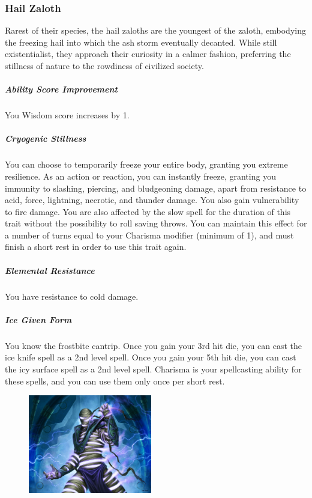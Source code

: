 \subsubsection{Hail Zaloth}
    Rarest of their species, the hail zaloths are the youngest of the zaloth, embodying the freezing hail into which the ash storm eventually decanted.
    While still existentialist, they approach their curiosity in a calmer fashion, preferring the stillness of nature to the rowdiness of civilized society.

    \subparagraph{Ability Score Improvement} You Wisdom score increases by 1.

    \subparagraph{Cryogenic Stillness} You can choose to temporarily freeze your entire body, granting you extreme resilience.
    As an action or reaction, you can instantly freeze, granting you immunity to slashing, piercing, and bludgeoning damage, apart from resistance to acid, force, lightning, necrotic, and thunder damage.
    You also gain vulnerability to fire damage.
    You are also affected by the slow spell for the duration of this trait without the possibility to roll saving throws.
    You can maintain this effect for a number of turns equal to your Charisma modifier (minimum of 1), and must finish a short rest in order to use this trait again.

    \subparagraph{Elemental Resistance} You have resistance to cold damage.

    \subparagraph{Ice Given Form} You know the frostbite cantrip.
    Once you gain your 3rd hit die, you can cast the ice knife spell as a 2nd level spell.
    Once you gain your 5th hit die, you can cast the icy surface spell as a 2nd level spell.
    Charisma is your spellcasting ability for these spells, and you can use them only once per short rest.

\begin{figure}[!b]
    \centering
    \includegraphics[width=0.48\textwidth]{04kins/img/20zaloth_thunder.jpg}
\end{figure}

\newpage
